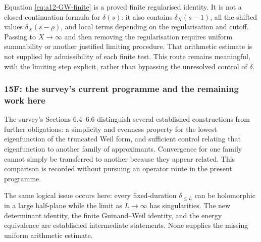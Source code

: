 Equation \eqref{eq:a12-GW-finite} is a proved finite regularised identity.
It is not a closed continuation formula for $\delta(s)$: it also
contains $\delta_X(s-1)$, all the shifted values $\delta_X(s-\rho)$,
and local terms depending on the regularisation and cutoff.
Passing to $X\to\infty$ and then removing the regularisation requires
uniform summability or another justified limiting procedure.
That arithmetic estimate is not supplied by admissibility of each
finite test. This route remains meaningful, with the limiting step
explicit, rather than bypassing the unresolved control of $\delta$.

\subsubsection{15F: the survey's current programme and the remaining work here}
\label{subsubsec:a12-survey-status}
The survey's Sections 6.4--6.6 distinguish several established
constructions from further obligations: a simplicity and evenness
property for the lowest eigenfunction of the truncated Weil form, and
sufficient control relating that eigenfunction to another family of
approximants. Convergence for one family cannot simply be transferred
to another because they appear related. This comparison is recorded
without pursuing an operator route in the present programme.

The same logical issue occurs here: every fixed-duration
$\delta_{\le L}$ can be holomorphic in a large half-plane while the
limit as $L\to\infty$ has singularities. The new determinant identity,
the finite Guinand--Weil identity, and the energy equivalence are
established intermediate statements. None supplies the missing
uniform arithmetic estimate.

\begin{center}
\end{center}
